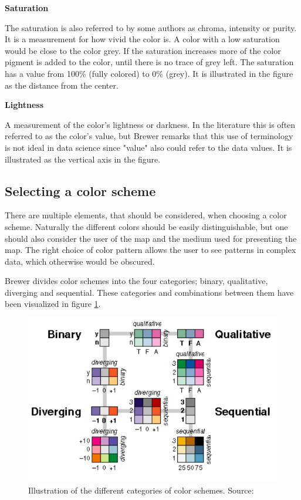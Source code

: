 \textbf{Saturation}

The saturation is also referred to by some authors as chroma, intensity or purity. It is a measurement for how vivid the color is. A color with a low saturation would be close to the color grey. If the saturation increases more of the color pigment is added to the color, until there is no trace of grey left. The saturation has a value from 100\% (fully colored) to 0\% (grey). It is illustrated in the figure as the distance from the center.

\textbf{Lightness}

A measurement of the color’s lightness or darkness. In the literature this is often referred to as the color's value, but Brewer remarks that this use of terminology is not ideal in data science since "value" also could refer to the data values. It is illustrated as the vertical axis in the figure.  \citep{Dent}

 
\subsection{Selecting a color scheme}
There are multiple elements, that should be considered, when choosing a color scheme.
Naturally the different colors should be easily distinguishable, but one should also consider the user of the map and the medium used for presenting the map. The right choice of color pattern allows the user to see patterns in complex data, which otherwise would be obscured. 


Brewer divides color schemes into the four categories; binary, qualitative, diverging and sequential. These categories and combinations between them have been visualized in figure \ref{BrewerDataTypes}. \citep{Brewer94}

\begin{figure} [H]
	\centering
	\includegraphics[width=.8\textwidth]{Pictures/BrewerDataTypes}
	\caption{Illustration of the different categories of color schemes. Source: \citet{ColorGuidelines}}
	\label{BrewerDataTypes}
\end{figure}
 


